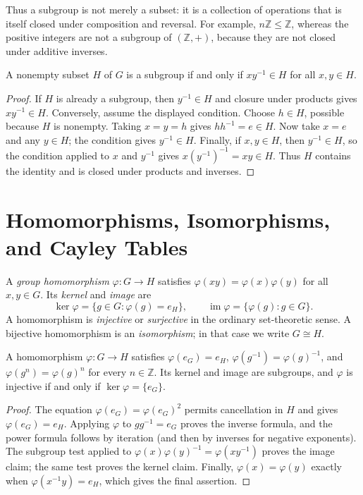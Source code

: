 Thus a subgroup is not merely a subset: it is a collection of operations that
is itself closed under composition and reversal. For example,
\(n\mathbb Z\leq\mathbb Z\), whereas the positive integers are not a subgroup
of \((\mathbb Z,+)\), because they are not closed under additive inverses.

\begin{proposition}
A nonempty subset \(H\) of \(G\) is a subgroup if and only if
\(xy^{-1}\in H\) for all \(x,y\in H\).
\end{proposition}
\begin{proof}
If \(H\) is already a subgroup, then \(y^{-1}\in H\) and closure under
products gives \(xy^{-1}\in H\).  Conversely, assume the displayed condition.
Choose \(h\in H\), possible because \(H\) is nonempty.  Taking \(x=y=h\)
gives \(hh^{-1}=e\in H\).  Now take \(x=e\) and any \(y\in H\); the condition
gives \(y^{-1}\in H\).  Finally, if \(x,y\in H\), then \(y^{-1}\in H\), so
the condition applied to \(x\) and \(y^{-1}\) gives
\(x(y^{-1})^{-1}=xy\in H\).  Thus \(H\) contains the identity and is closed
under products and inverses.
\end{proof}

\section{Homomorphisms, Isomorphisms, and Cayley Tables}

\begin{definition}
A \emph{group homomorphism} \(\varphi:G\to H\) satisfies
\(\varphi(xy)=\varphi(x)\varphi(y)\) for all \(x,y\in G\). Its
\emph{kernel} and \emph{image} are
\[
\ker\varphi=\{g\in G:\varphi(g)=e_H\},\qquad
\operatorname{im}\varphi=\{\varphi(g):g\in G\}.
\]
A homomorphism is \emph{injective} or \emph{surjective} in the ordinary
set-theoretic sense. A bijective homomorphism is an \emph{isomorphism}; in
that case we write \(G\cong H\).
\end{definition}

\begin{proposition}
A homomorphism \(\varphi:G\to H\) satisfies
\(\varphi(e_G)=e_H\), \(\varphi(g^{-1})=\varphi(g)^{-1}\), and
\(\varphi(g^n)=\varphi(g)^n\) for every \(n\in\mathbb Z\). Its kernel and
image are subgroups, and \(\varphi\) is injective if and only if
\(\ker\varphi=\{e_G\}\).
\end{proposition}
\begin{proof}
The equation \(\varphi(e_G)=\varphi(e_G)^2\) permits cancellation in \(H\)
and gives \(\varphi(e_G)=e_H\). Applying \(\varphi\) to
\(gg^{-1}=e_G\) proves the inverse formula, and the power formula follows by
iteration (and then by inverses for negative exponents). The subgroup test
applied to \(\varphi(x)\varphi(y)^{-1}=\varphi(xy^{-1})\) proves the image
claim; the same test proves the kernel claim. Finally,
\(\varphi(x)=\varphi(y)\) exactly when
\(\varphi(x^{-1}y)=e_H\), which gives the final assertion.
\end{proof}

